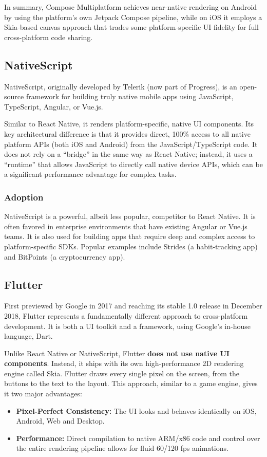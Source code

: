     In summary, Compose Multiplatform achieves near-native rendering on Android by using the platform's own Jetpack Compose pipeline, while on iOS it employs a Skia-based canvas approach that trades some platform-specific UI fidelity for full cross-platform code sharing.

    \subsection{NativeScript}
        NativeScript, originally developed by Telerik (now part of Progress), is an open-source framework for building truly native mobile apps using JavaScript, TypeScript, Angular, or Vue.js. \cite{NS:00}
        
        Similar to React Native, it renders platform-specific, native UI components. Its key architectural difference is that it provides direct, 100\% access to all native platform APIs (both iOS and Android) from the JavaScript/TypeScript code. It does not rely on a ``bridge'' in the same way as React Native; instead, it uses a ``runtime'' that allows JavaScript to directly call native device APIs, which can be a significant performance advantage for complex tasks.
        
        \subsubsection{Adoption}
        NativeScript is a powerful, albeit less popular, competitor to React Native. It is often favored in enterprise environments that have existing Angular or Vue.js teams. It is also used for building apps that require deep and complex access to platform-specific SDKs. Popular examples include Strides (a habit-tracking app) and BitPoints (a cryptocurrency app). \cite{NS:01}

    \subsection{Flutter}
        First previewed by Google in 2017\cite{Flutter:01} and reaching its stable 1.0 release in December 2018, Flutter represents a fundamentally different approach to cross-platform development. It is both a UI toolkit and a framework, using Google's in-house language, Dart.
        
        Unlike React Native or NativeScript, Flutter \textbf{does not use native UI components}. Instead, it ships with its own high-performance 2D rendering engine called Skia. Flutter draws every single pixel on the screen, from the buttons to the text to the layout. This approach, similar to a game engine, gives it two major advantages:
        \begin{itemize}
            \item \textbf{Pixel-Perfect Consistency:} The UI looks and behaves identically on iOS, Android, Web and Desktop.
            \item \textbf{Performance:} Direct compilation to native ARM/x86 code and control over the entire rendering pipeline allows for fluid 60/120 fps animations.
        \end{itemize}
        \cite{Flutter:00}
        
